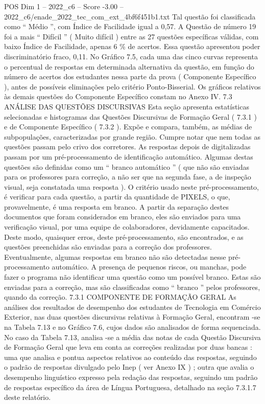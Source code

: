 \begin{textsample}{POS Dim 1 – 2022\_c6 – Score -3.00 – 2022\_c6/enade\_2022\_tec\_com\_ext\_4bf6f451b1.txt}
Tal questão foi classificada como “ Médio ”, com Índice de Facilidade igual a 0,57.
A Questão de número 19 foi a mais “ Difícil ” ( Muito difícil ) entre as 27 questões específicas válidas, com baixo Índice de Facilidade, apenas 6 \% de acertos.
Essa questão apresentou poder discriminatório fraco, 0,11.
No Gráfico 7.5, cada uma das cinco curvas representa o percentual de respostas em determinada alternativa da questão, em função do número de acertos dos estudantes nessa parte da prova ( Componente Específico ), antes de possíveis eliminações pelo critério Ponto-Bisserial.
Os gráficos relativos às demais questões do Componente Específico constam no Anexo IV. 7.3 ANÁLISE DAS QUESTÕES DISCURSIVAS Esta seção apresenta estatísticas selecionadas e histogramas das Questões Discursivas de Formação Geral ( 7.3.1 ) e de Componente Específico ( 7.3.2 ).
Expõe e compara, também, as médias de subpopulações, caracterizadas por grande região.
Cumpre notar que nem todas as questões passam pelo crivo dos corretores.
As respostas depois de digitalizadas passam por um pré-processamento de identificação automático.
Algumas destas questões são definidas como um “ branco automático ” ( que não são enviadas para os professores para correção, a não ser que na segunda fase, a de inspeção visual, seja constatada uma resposta ).
O critério usado neste pré-processamento, é verificar para cada questão, a partir da quantidade de PIXELS, o que, provavelmente, é uma resposta em branco.
A partir da separação destes documentos que foram considerados em branco, eles são enviados para uma verificação visual, por uma equipe de colaboradores, devidamente capacitados.
Deste modo, quaisquer erros, deste pré-processamento, são encontrados, e as questões preenchidas são enviadas para a correção dos professores.
Eventualmente, algumas respostas em branco não são detectadas nesse pré-processamento automático.
A presença de pequenos riscos, ou manchas, pode fazer o programa não identificar uma questão como um possível branco.
Estas são enviadas para a correção, mas são classificadas como “ branco ” pelos professores, quando da correção. 7.3.1 COMPONENTE DE FORMAÇÃO GERAL As análises dos resultados de desempenho dos estudantes de Tecnologia em Comércio Exterior, nas duas questões discursivas relativas à Formação Geral, encontram -se na Tabela 7.13 e no Gráfico 7.6, cujos dados são analisados de forma sequenciada.
No caso da Tabela 7.13, analisa -se a média das notas de cada Questão Discursiva de Formação Geral que leva em conta as correções realizadas por duas bancas : uma que analisa e pontua aspectos relativos ao conteúdo das respostas, seguindo o padrão de respostas divulgado pelo Inep ( ver Anexo IX ) ; outra que avalia o desempenho linguístico expresso pela redação das respostas, seguindo um padrão de respostas específico da área de Língua Portuguesa, detalhado na seção 7.3.1.7 deste relatório.

\end{textsample}
